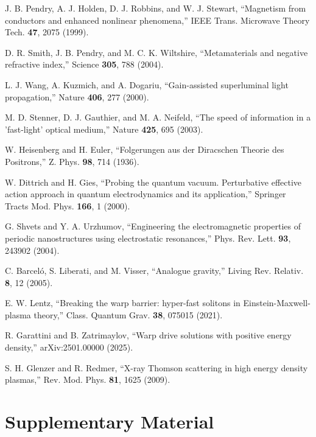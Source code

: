\documentclass[aps,prl,reprint,groupedaddress]{revtex4-1}
\begin{document}
\begin{thebibliography}{99}

J. B. Pendry, A. J. Holden, D. J. Robbins, and W. J. Stewart,
``Magnetism from conductors and enhanced nonlinear phenomena,''
IEEE Trans. Microwave Theory Tech. \textbf{47}, 2075 (1999).

D. R. Smith, J. B. Pendry, and M. C. K. Wiltshire,
``Metamaterials and negative refractive index,''
Science \textbf{305}, 788 (2004).

L. J. Wang, A. Kuzmich, and A. Dogariu,
``Gain-assisted superluminal light propagation,''
Nature \textbf{406}, 277 (2000).

M. D. Stenner, D. J. Gauthier, and M. A. Neifeld,
``The speed of information in a 'fast-light' optical medium,''
Nature \textbf{425}, 695 (2003).

W. Heisenberg and H. Euler,
``Folgerungen aus der Diracschen Theorie des Positrons,''
Z. Phys. \textbf{98}, 714 (1936).

W. Dittrich and H. Gies,
``Probing the quantum vacuum. Perturbative effective action approach in quantum electrodynamics and its application,''
Springer Tracts Mod. Phys. \textbf{166}, 1 (2000).

G. Shvets and Y. A. Urzhumov,
``Engineering the electromagnetic properties of periodic nanostructures using electrostatic resonances,''
Phys. Rev. Lett. \textbf{93}, 243902 (2004).

C. Barceló, S. Liberati, and M. Visser,
``Analogue gravity,''
Living Rev. Relativ. \textbf{8}, 12 (2005).

E. W. Lentz,
``Breaking the warp barrier: hyper-fast solitons in Einstein-Maxwell-plasma theory,''
Class. Quantum Grav. \textbf{38}, 075015 (2021).

R. Garattini and B. Zatrimaylov,
``Warp drive solutions with positive energy density,''
arXiv:2501.00000 (2025).

S. H. Glenzer and R. Redmer,
``X-ray Thomson scattering in high energy density plasmas,''
Rev. Mod. Phys. \textbf{81}, 1625 (2009).

\end{thebibliography}

\appendix

\section{Supplementary Material}
\end{document}
